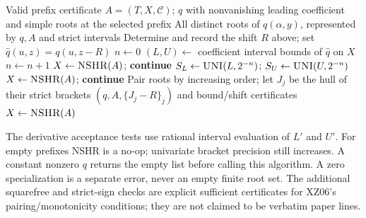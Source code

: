 \documentclass[11pt]{article}
\theoremstyle{definition}
\newcommand{\alg}[1]{\textsc{#1}}
\begin{document}
\begin{algorithm}[H]
\caption{XZ-LIFT: certified version of NREALZERO Step 2}\label{a:lift}
\begin{algorithmic}[1]
\Require Valid prefix certificate $A=(T,X,\mathcal C)$; $q$ with nonvanishing
leading coefficient and simple roots at the selected prefix
\Ensure All distinct roots of $q(\alpha,y)$, represented by $q,A$ and strict intervals
\State Determine and record the shift $R$ above; set $\widehat q(u,z)=q(u,z-R)$
\State $n\gets0$
\Loop
 \State $(L,U)\gets$ coefficient interval bounds of $\widehat q$ on $X$
 \State $n\gets n+1$
  \State $X\gets\alg{NSHR}(A)$; \textbf{continue}
 \EndIf
 \State $S_L\gets\alg{UNI}(L,2^{-n})$; $S_U\gets\alg{UNI}(U,2^{-n})$
  \State $X\gets\alg{NSHR}(A)$; \textbf{continue}
 \EndIf
 \State Pair roots by increasing order; let $J_j$ be the hull of their strict brackets
  \State \Return $(q,A,\{J_j-R\}_j)$ and bound/shift certificates
 \EndIf
 \State $X\gets\alg{NSHR}(A)$
\EndLoop
\end{algorithmic}
\end{algorithm}
The derivative acceptance tests use rational interval evaluation of $L'$ and $U'$.
For empty prefixes NSHR is a no-op; univariate bracket precision still increases.
A constant nonzero $q$ returns the empty list before calling this algorithm. A zero
specialization is a separate error, never an empty finite root set. The additional
squarefree and strict-sign checks are explicit sufficient certificates for XZ06's
pairing/monotonicity conditions; they are not claimed to be verbatim paper lines.
\end{document}
